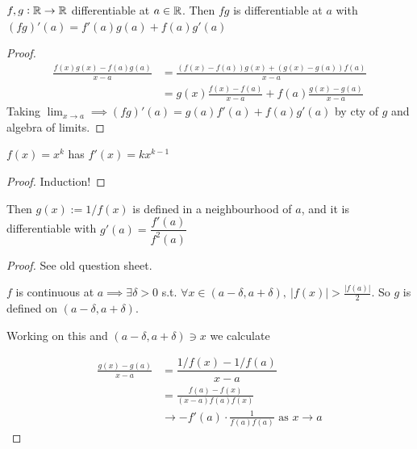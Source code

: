 \documentclass[twoside]{scrartcl}
\begin{document}
\begin{theorem} $f,g : \mathbb{R} \to \mathbb{R}$ differentiable at $a \in \mathbb{R}$. Then $fg$ is differentiable at $a$ with $(fg)'(a) = f'(a)g(a) + f(a)g'(a)$
\end{theorem}
\begin{proof}
\[\begin{aligned}
	\frac{f(x)g(x) - f(a)g(a)}{x-a} &= \frac{(f(x)-f(a))g(x) + (g(x) - g(a))f(a)}{x-a} \\ 
	&= g(x) \frac{f(x)-f(a)}{x-a} + f(a)\frac{g(x)-g(a)}{x-a}
\end{aligned}
\]
Taking $\lim_{x\to a} \implies (fg)'(a) = g(a)f'(a) + f(a)g'(a)$ by cty of $g$ and algebra of limits.
\end{proof}
\pagebreak

\begin{corollary}
$f(x) = x^k$ has $f'(x) = kx^{k-1}$	
\end{corollary}
\begin{proof}
Induction!	
\end{proof}

Then $g(x) := 1/f(x)$ is defined in a neighbourhood of $a$, and it is differentiable with $g'(a) = \dfrac{f'(a)}{f^2(a)}$

\begin{proof}
See old question sheet.

 $f$ is continuous at $a \implies \exists \delta > 0$ s.t. $\forall x \in (a-\delta,a+\delta),~|f(x)| > \frac{|f(a)|}{2}$. So $g$ is defined on $(a-\delta,a+\delta)$. 
 
 Working on this and $(a-\delta,a+\delta)\ni x$ we calculate
 
 \[\begin{aligned}\frac{g(x) -g(a)}{x-a} &= \dfrac{1/f(x) -1/f(a)}{x-a}\\
 &= \frac{f(a) - f(x)}{(x-a)f(a)f(x)}\\
 &\to -f'(a)\cdot\frac{1}{f(a)f(a)} \text{ as } x \to a
\end{aligned}\]
\end{proof}
\end{document}

